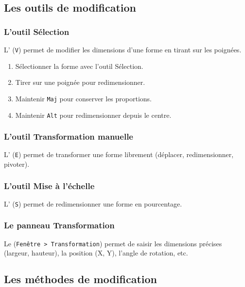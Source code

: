 \subsection{Les outils de modification}

\subsubsection{L'outil Sélection}

L' (\texttt{V}) permet de modifier les dimensions d'une forme en tirant sur les poignées.

\begin{enumerate}
    \item Sélectionner la forme avec l'outil Sélection.
    \item Tirer sur une poignée pour redimensionner.
    \item Maintenir \texttt{Maj} pour conserver les proportions.
    \item Maintenir \texttt{Alt} pour redimensionner depuis le centre.
\end{enumerate}

\subsubsection{L'outil Transformation manuelle}

L' (\texttt{E}) permet de transformer une forme librement (déplacer, redimensionner, pivoter).

\subsubsection{L'outil Mise à l'échelle}

L' (\texttt{S}) permet de redimensionner une forme en pourcentage.

\subsubsection{Le panneau Transformation}

Le  (\texttt{Fenêtre > Transformation}) permet de saisir les dimensions précises (largeur, hauteur), la position (X, Y), l'angle de rotation, etc.

\subsection{Les méthodes de modification}

